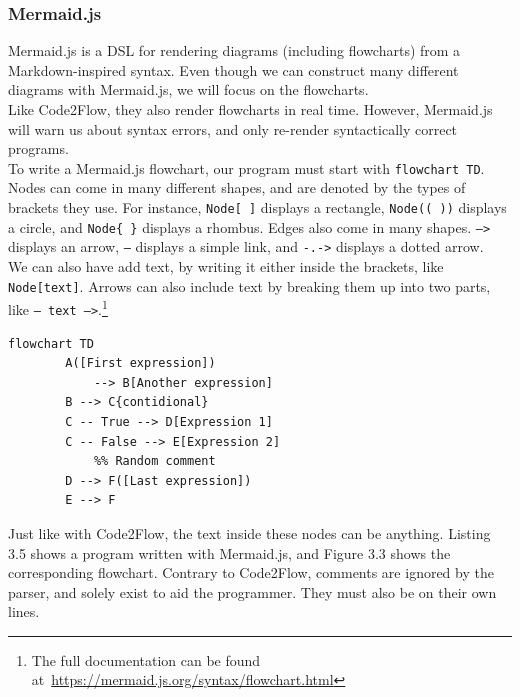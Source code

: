 \subsubsection{Mermaid.js}

Mermaid.js is a DSL for rendering diagrams (including flowcharts) from a Markdown-inspired syntax. Even though we can construct many different diagrams with Mermaid.js, we will focus on the flowcharts. \\

Like Code2Flow, they also render flowcharts in real time. However, Mermaid.js will warn us about syntax errors, and only re-render syntactically correct programs. \\

To write a Mermaid.js flowchart, our program must start with \texttt{flowchart TD}. Nodes can come in many different shapes, and are denoted by the types of brackets they use. For instance, \texttt{Node[ ]} displays a rectangle, \texttt{Node(( ))} displays a circle, and \texttt{Node\{ \}} displays a rhombus. Edges also come in many shapes. \texttt{-->} displays an arrow, \texttt{---} displays a simple link, and \texttt{-.->} displays a dotted arrow. \hfill \\

We can also have add text, by writing it either inside the brackets, like \texttt{Node[text]}. Arrows can also include text by breaking them up into two parts, like \texttt{-- text -->}.\footnote{The full documentation can be found at~\url{https://mermaid.js.org/syntax/flowchart.html}} \\

\begin{lstlisting}[caption={A mermaid.js program}, captionpos=b]
    flowchart TD
        A([First expression])
            --> B[Another expression]
        B --> C{contidional}
        C -- True --> D[Expression 1]
        C -- False --> E[Expression 2]
            %% Random comment
        D --> F([Last expression])
        E --> F
\end{lstlisting}

Just like with Code2Flow, the text inside these nodes can be anything. Listing 3.5 shows a program written with Mermaid.js, and Figure 3.3 shows the corresponding flowchart. Contrary to Code2Flow, comments are ignored by the parser, and solely exist to aid the programmer. They must also be on their own lines. \\

